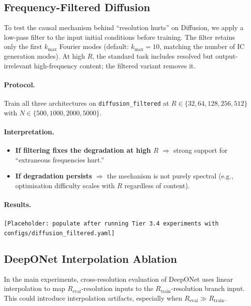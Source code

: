\documentclass[11pt]{article}
\begin{document}
\subsection{Frequency-Filtered Diffusion}
\label{app:filtered}

To test the causal mechanism behind ``resolution hurts'' on Diffusion,
we apply a low-pass filter to the input initial conditions before
training. The filter retains only the first $k_{\max}$ Fourier modes
(default: $k_{\max} = 10$, matching the number of IC generation modes).
At high $R$, the standard task includes resolved but output-irrelevant
high-frequency content; the filtered variant removes it.

\paragraph{Protocol.}
Train all three architectures on \texttt{diffusion\_filtered} at
$R \in \{32, 64, 128, 256, 512\}$ with
$N \in \{500, 1000, 2000, 5000\}$.

\paragraph{Interpretation.}
\begin{itemize}
  \item \textbf{If filtering fixes the degradation at high $R$}
    $\Rightarrow$ strong support for ``extraneous frequencies hurt.''
  \item \textbf{If degradation persists} $\Rightarrow$ the mechanism
    is not purely spectral (e.g., optimisation difficulty scales with
    $R$ regardless of content).
\end{itemize}

\paragraph{Results.}
\texttt{[Placeholder: populate after running Tier 3.4 experiments
with configs/diffusion\_filtered.yaml]}

\subsection{DeepONet Interpolation Ablation}
\label{app:deeponet-ablation}

In the main experiments, cross-resolution evaluation of DeepONet
uses linear interpolation to map $R_{\mathrm{eval}}$-resolution
inputs to the $R_{\mathrm{train}}$-resolution branch input. This
could introduce interpolation artifacts, especially when
$R_{\mathrm{eval}} \gg R_{\mathrm{train}}$.
\end{document}
